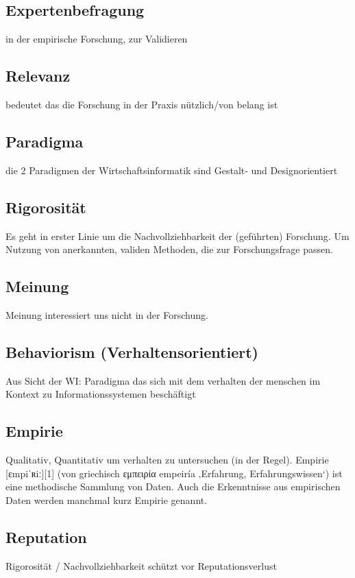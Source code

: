 \documentclass[DIV=calc, paper=a4, fontsize=11pt, twocolumn]{scrartcl}	 %
\begin{document}
\subsection*{Expertenbefragung}
in der empirische Forschung, zur Validieren

\subsection*{Relevanz}
bedeutet das die Forschung in der Praxis n\"utzlich/von belang ist

\subsection*{Paradigma}
die 2 Paradigmen der Wirtschaftsinformatik sind Gestalt- und Designorientiert

\subsection*{Rigorosit\"at}
Es geht in erster Linie um die Nachvollziehbarkeit der (gef\"uhrten) Forschung. Um Nutzung von anerkannten, validen Methoden, die zur Forschungsfrage passen.
\subsection*{Meinung}
Meinung interessiert uns nicht in der Forschung.

\subsection*{Behaviorism (Verhaltensorientiert)}
Aus Sicht der WI: Paradigma das sich mit dem verhalten der menschen im Kontext zu Informationssystemen besch\"aftigt

\subsection*{Empirie}
Qualitativ, Quantitativ um verhalten zu untersuchen (in der Regel).
Empirie [ɛmpiˈʀiː][1] (von griechisch εμπειρία empeiría ‚Erfahrung, Erfahrungswissen‘) ist eine methodische Sammlung von Daten. Auch die Erkenntnisse aus empirischen Daten werden manchmal kurz Empirie genannt.\cite{Wikipedia:2016a}
\subsection*{Reputation}
Rigorosit\"at / Nachvollziehbarkeit sch\"utzt vor Reputationsverlust
\end{document}
